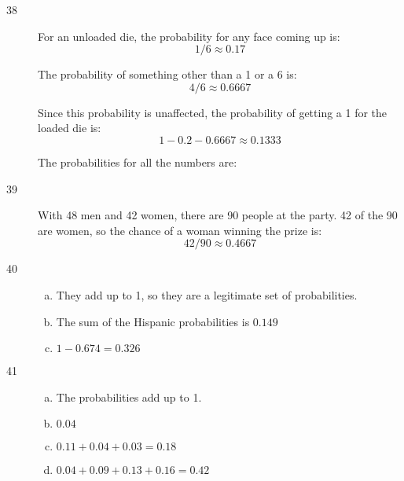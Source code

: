 \documentclass[letterpaper, landscape]{exam}
\begin{document}
\begin{description}
      \item[38]
        For an unloaded die, the probability for any face coming up is:
        \[
          1/6 \approx 0.17
        \]

        The probability of something other than a 1 or a 6 is:
        \[
          4/6 \approx 0.6667
        \]

        Since this probability is unaffected, the probability of getting a 1 for
        the loaded die is:
        \[
          1 - 0.2 - 0.6667 \approx 0.1333
        \]

        The probabilities for all the numbers are:

      \item[39]
        With 48 men and 42 women, there are 90 people at the party. 42 of the 90
        are women, so the chance of a woman winning the prize is:
        \[
          42 / 90 \approx \boxed{ 0.4667 }
        \]

      \item[40]
        \begin{enumerate}[(a)]
          \item They add up to 1, so they are a legitimate set of probabilities.

          \item The sum of the Hispanic probabilities is $\boxed{ 0.149 }$

          \item $1 - 0.674 = \boxed{ 0.326 }$
        \end{enumerate}

      \item[41]
        \begin{enumerate}[(a)]
          \item The probabilities add up to 1.

          \item $\boxed{ 0.04 }$

          \item $0.11 + 0.04 + 0.03 = \boxed{ 0.18 }$

          \item $0.04 + 0.09 + 0.13 + 0.16 = \boxed{ 0.42 }$


\end{enumerate}
\end{description}
\end{document}
